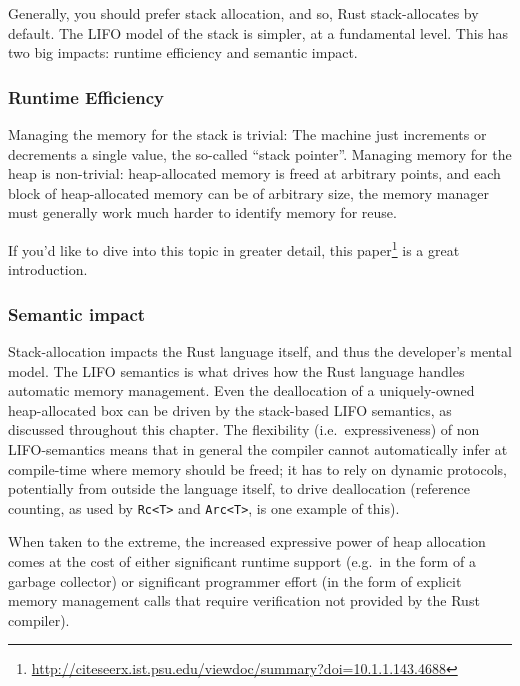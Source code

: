 \documentclass[a4paper,]{book}
\renewcommand{\href}[2]{#2\footnote{\url{#1}}}
\begin{document}
Generally, you should prefer stack allocation, and so, Rust
stack-allocates by default. The LIFO model of the stack is simpler, at a
fundamental level. This has two big impacts: runtime efficiency and
semantic impact.

\subsubsection{Runtime Efficiency}\label{runtime-efficiency}

Managing the memory for the stack is trivial: The machine just
increments or decrements a single value, the so-called ``stack
pointer''. Managing memory for the heap is non-trivial: heap-allocated
memory is freed at arbitrary points, and each block of heap-allocated
memory can be of arbitrary size, the memory manager must generally work
much harder to identify memory for reuse.

If you'd like to dive into this topic in greater detail,
\href{http://citeseerx.ist.psu.edu/viewdoc/summary?doi=10.1.1.143.4688}{this
paper} is a great introduction.

\subsubsection{Semantic impact}\label{semantic-impact}

Stack-allocation impacts the Rust language itself, and thus the
developer's mental model. The LIFO semantics is what drives how the Rust
language handles automatic memory management. Even the deallocation of a
uniquely-owned heap-allocated box can be driven by the stack-based LIFO
semantics, as discussed throughout this chapter. The flexibility
(i.e.~expressiveness) of non LIFO-semantics means that in general the
compiler cannot automatically infer at compile-time where memory should
be freed; it has to rely on dynamic protocols, potentially from outside
the language itself, to drive deallocation (reference counting, as used
by \texttt{Rc\textless{}T\textgreater{}} and
\texttt{Arc\textless{}T\textgreater{}}, is one example of this).

When taken to the extreme, the increased expressive power of heap
allocation comes at the cost of either significant runtime support
(e.g.~in the form of a garbage collector) or significant programmer
effort (in the form of explicit memory management calls that require
verification not provided by the Rust compiler).

\end{document}
